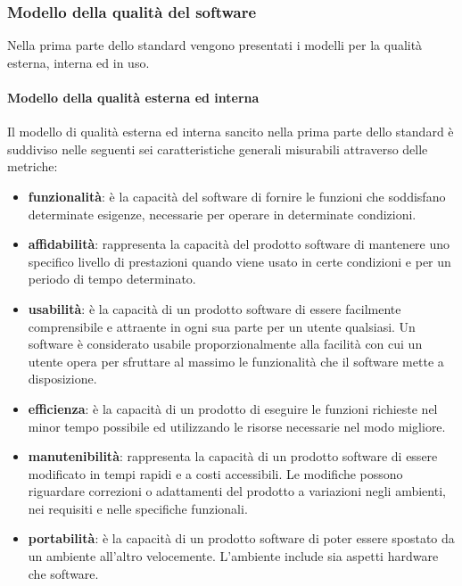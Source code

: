 		\subsubsection{Modello della qualità del software}
		Nella prima parte dello standard vengono presentati i modelli per la qualità esterna, interna ed in uso.
			\paragraph{Modello della qualità esterna ed interna}
			Il modello di qualità esterna ed interna sancito nella prima parte dello standard è suddiviso nelle seguenti sei caratteristiche generali misurabili attraverso delle metriche:
			\begin{itemize}
				\item \textbf{funzionalità}: è la capacità del software di fornire le funzioni che soddisfano determinate esigenze, necessarie per operare in determinate condizioni. 
				\item \textbf{affidabilità}: rappresenta la capacità del prodotto software di mantenere uno specifico livello di prestazioni quando viene usato in certe condizioni e per un periodo di tempo determinato.
				\item \textbf{usabilità}: è la capacità di un prodotto software di essere facilmente comprensibile e attraente in ogni sua parte per un utente qualsiasi. Un software è considerato usabile proporzionalmente alla facilità con cui un utente opera per sfruttare al massimo le funzionalità che il software mette a disposizione.
				\item \textbf{efficienza}: è la capacità di un prodotto di eseguire le funzioni richieste nel minor tempo possibile ed utilizzando le risorse necessarie nel modo migliore.
				\item \textbf{manutenibilità}: rappresenta la capacità di un prodotto software di essere modificato in tempi rapidi e a costi accessibili. Le modifiche possono riguardare correzioni o adattamenti del prodotto a variazioni negli ambienti, nei requisiti e nelle specifiche funzionali.
				\item \textbf{portabilità}: è la capacità di un prodotto software di poter essere spostato da un ambiente all'altro velocemente. L'ambiente include sia aspetti hardware che software.
			\end{itemize}
			
